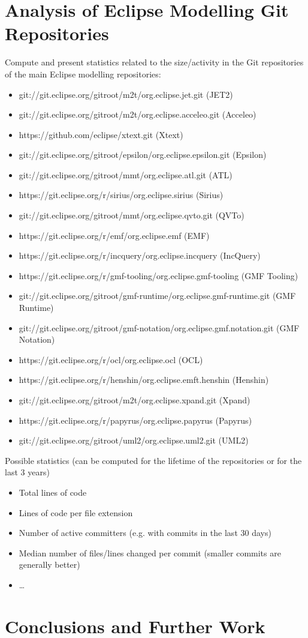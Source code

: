 \documentclass[runningheads,a4paper]{llncs}
\begin{document}
\section{Analysis of Eclipse Modelling Git Repositories}
Compute and present statistics related to the size/activity in the Git repositories of the main Eclipse modelling repositories:

\begin{itemize}
  \item git://git.eclipse.org/gitroot/m2t/org.eclipse.jet.git (JET2)
  \item git://git.eclipse.org/gitroot/m2t/org.eclipse.acceleo.git (Acceleo)
  \item https://github.com/eclipse/xtext.git (Xtext)
  \item git://git.eclipse.org/gitroot/epsilon/org.eclipse.epsilon.git (Epsilon)
  \item git://git.eclipse.org/gitroot/mmt/org.eclipse.atl.git (ATL)
  \item https://git.eclipse.org/r/sirius/org.eclipse.sirius (Sirius)
  \item git://git.eclipse.org/gitroot/mmt/org.eclipse.qvto.git (QVTo)
  \item https://git.eclipse.org/r/emf/org.eclipse.emf (EMF)
  \item https://git.eclipse.org/r/incquery/org.eclipse.incquery (IncQuery)
  \item https://git.eclipse.org/r/gmf-tooling/org.eclipse.gmf-tooling (GMF Tooling)
  \item git://git.eclipse.org/gitroot/gmf-runtime/org.eclipse.gmf-runtime.git (GMF Runtime)
  \item git://git.eclipse.org/gitroot/gmf-notation/org.eclipse.gmf.notation.git  (GMF Notation)
  \item https://git.eclipse.org/r/ocl/org.eclipse.ocl (OCL)
  \item https://git.eclipse.org/r/henshin/org.eclipse.emft.henshin (Henshin)
  \item git://git.eclipse.org/gitroot/m2t/org.eclipse.xpand.git (Xpand)
  \item https://git.eclipse.org/r/papyrus/org.eclipse.papyrus (Papyrus)
  \item git://git.eclipse.org/gitroot/uml2/org.eclipse.uml2.git (UML2)
\end{itemize}

Possible statistics (can be computed for the lifetime of the repositories or for the last 3 years)
\begin{itemize}
  \item Total lines of code
  \item Lines of code per file extension 
  \item Number of active committers (e.g. with commits in the last 30 days)
  \item Median number of files/lines changed per commit (smaller commits are generally better)
  \item \ldots
\end{itemize}

\section{Conclusions and Further Work}




\end{document}
